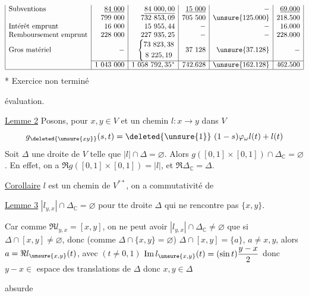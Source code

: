 \[\begin{array}{|l|r|r|r|r|r|}
\text{Subventions}&\underline{84\ 000}&\underline{84\ 000,00}&\underline{15\ 000}&-&\underline{69.000}\\
&799\ 000&732\ 853,09&705\ 500&\unsure{125.000}&218.500\\
\text{Intérêt emprunt}&16\ 000&15\ 955,44&-&-&16.000\\
\text{Remboursement emprunt}&228\ 000&227\ 935,25&-&-&228.000\\
\text{Gros matériel}&-&\left\{\begin{gathered}73\ 823,38\\8\ 225,19\end{gathered}\right.&37\ 128&\unsure{37.128}&-\\\cline{2-6}
&1\ 043\ 000&1\ 058\ 792,35^*&742.628&\unsure{162.128}&462.500\\\hline
\end{array}
\]
* Exercice non terminé\par
évaluation.

\uline{Lemme 2} 
 Posons, pour $x,y\in V$ et un chemin
$l:x\to y$ dans $V$
\[
g_{\deleted{\unsure{xy}}}(s,t)=\deleted{\unsure{1}}\ (1-s)\varphi_\omega l(t)+l(t)
\]
Soit $\Delta$ une droite de $V$ telle que
 $|l|\cap\Delta=\varnothing$.
Alors $g([0,1]\times[0,1])\cap\Delta_{\mathbb C}=\varnothing$.
En effet, on a $\Re g([0,1]\times[0,1])=|l|$, et
$\Re\Delta_{\mathbb C}=\Delta$.

\uline{Corollaire}\quad {} $l$ est un chemin
de $V^{**}$, on a commutativité de

\uline{Lemme 3} 
$|l_{y,x}|\cap\Delta_{\mathbb C}=\varnothing$ pour tte
droite $\Delta$  qui ne rencontre pas $\{x,y\}$.

Car comme $\Re l_{y,x}=[x,y]$,
on ne peut avoir $|l_{y,x}|\cap\Delta_{\mathbb C}\ne\varnothing$ que si
$\Delta\cap[x,y]\ne\varnothing$, donc (comme $\Delta\cap\{x,y\}=\varnothing$)
$\Delta\cap[x,y]=\{a\}$, $a\ne x,y$, 
alors  $a=\Re l_{\unsure{x,y}}(t)$, avec $(t\ne0,1)$
$\operatorname{Im}l_{\unsure{x,y}}(t)=(\sin t)\dfrac{y-x}{2}$ donc
$y-x\in$ espace  des translations de $\Delta$
donc $x,y\in\Delta$\par
absurde

